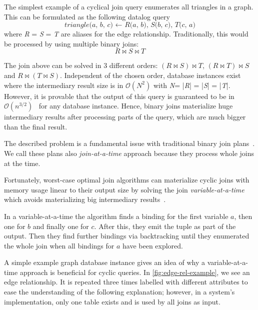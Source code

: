The simplest example of a cyclical join query enumerates all triangles in a graph.
This can be formulated as the following datalog query
\begin{equation}
    \textit{triangle(a, b, c) $\leftarrow$ R(a, b), S(b, c), T(c, a)} \label{eqn:triangle}
\end{equation}
where \textit{R} = \textit{S} = \textit{T} are aliases for the edge relationship.
Traditionally, this would be processed by using multiple binary joins:
\begin{equation}
    R \bowtie S \bowtie T
\end{equation}

The join above can be solved in 3 different orders: $ (R \bowtie S) \bowtie T$, $ (R \bowtie T) \bowtie S$ and
$ R \bowtie (T \bowtie S)$.
Independent of the chosen order, database instances exist where the intermediary result size is in $\mathcal{O}(N^2)$ with
\textit{N}= |\textit{R}| = |\textit{S}| = |\textit{T}|.
However, it is provable that the output of this query is guaranteed to be in $\mathcal{O}(n^{3/2})$~\cite{agm,skew-strikes-back}
for any database instance.
Hence, binary joins materialize huge intermediary results after processing parts of the query,
which are much bigger than the final result.

The described problem is a fundamental issue with traditional binary join plans~\cite{agm,skew-strikes-back}.
We call these plans also \textit{join-at-a-time} approach because they process whole joins at the time.

Fortunately, worst-case optimal join algorithms can materialize cyclic joins with memory usage linear to their output size
by solving the join \textit{variable-at-a-time} which avoids materializing big intermediary results~\cite{leapfrog,nprr}.

In a variable-at-a-time the algorithm finds a binding for the first variable $a$, then one for $b$ and
finally one for $c$.
After this, they emit the tuple as part of the output.
Then they find further bindings via backtracking until they enumerated the whole join when all bindings for $a$ have been explored.

A simple example graph database instance gives an idea of why a variable-at-a-time approach is beneficial for cyclic queries.
In \cref{fig:edge-rel-example}, we see an edge relationship.
It is repeated three times labelled with different attributes to ease the understanding of the following explanation;
however, in a system's implementation, only one table exists and is used by all joins as input.

